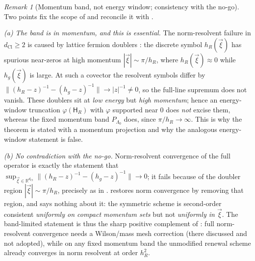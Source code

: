 \documentclass[11pt]{article}
\theoremstyle{definition}
\theoremstyle{remark}
\newtheorem{remark}[theorem]{Remark}
\newcommand{\R}{\mathbb{R}}
\newcommand{\dCl}{d_{\mathrm{Cl}}}
\newcommand{\Ham}{\mathsf{H}}
\begin{document}
\begin{remark}[Momentum band, not energy window; consistency with the no-go]
\label{rem:band-not-energy}
Two points fix the scope of  and reconcile it with
.

\emph{(a) The band is in momentum, and this is essential.}  The norm-resolvent
failure in $\dCl\ge2$ is caused by lattice fermion doublers
\cite{nielsenninomiya1981a,nielsenninomiya1981b}: the discrete symbol
$h_R(\vec\xi)$ has spurious near-zeros at high momentum
$|\vec\xi|\sim\pi/h_R$, where $h_R(\vec\xi)\approx0$ while $h_g(\vec\xi)$ is
large.  At such a covector the resolvent symbols differ by
$\bigl\lVert(h_R-z)^{-1}-(h_g-z)^{-1}\bigr\rVert\to|z|^{-1}\neq0$, so the
full-line supremum does not vanish.  These doublers sit at \emph{low energy} but
\emph{high momentum}; hence an energy-window truncation $\varphi(\Ham_R)$ with
$\varphi$ supported near $0$ does \emph{not} excise them, whereas the fixed
momentum band $P_{\Lambda_0}$ does, since $\pi/h_R\to\infty$.  This is why the
theorem is stated with a momentum projection and why the analogous energy-window
statement is false.

\emph{(b) No contradiction with the no-go.}  Norm-resolvent convergence of the
full operator is exactly the statement that
$\sup_{\vec\xi\in\R^{\dCl}}\lVert(h_R-z)^{-1}-(h_g-z)^{-1}\rVert\to0$; it fails because
of the doubler region $|\vec\xi|\sim\pi/h_R$, precisely as in
\cite{corneangardejensen2022,schmidtumeda2023}.  
restores norm convergence by removing that region, and says nothing about it: the
symmetric scheme is second-order consistent \emph{uniformly on compact momentum
sets} but not \emph{uniformly in $\vec\xi$}.  The band-limited statement is thus
the sharp positive complement of : full
norm-resolvent convergence needs a Wilson/mass mesh correction
\cite{wilson1977} \textup{(}there discussed and not adopted\textup{)}, while on any fixed momentum
band the unmodified renewal scheme already converges in norm resolvent at order
$h_R^2$.
\end{remark}
\end{document}
